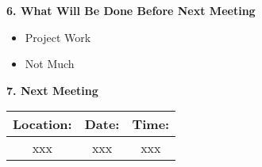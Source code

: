 \documentclass[12pt]{article}
\begin{document}
\begin{flushleft}
\textbf{6. What Will Be Done Before Next Meeting}\\
\begin{itemize}
\item Project Work
\item Not Much
\end{itemize}

\textbf{7. Next Meeting}\\
\begin{center}
 \begin{tabular}{|c | c | c |} 
\hline
 Location: & Date: & Time: \\ 
 \hline
 xxx & xxx & xxx\\
\hline
\end{tabular}
\end{center}

\end{flushleft}
\end{document}
